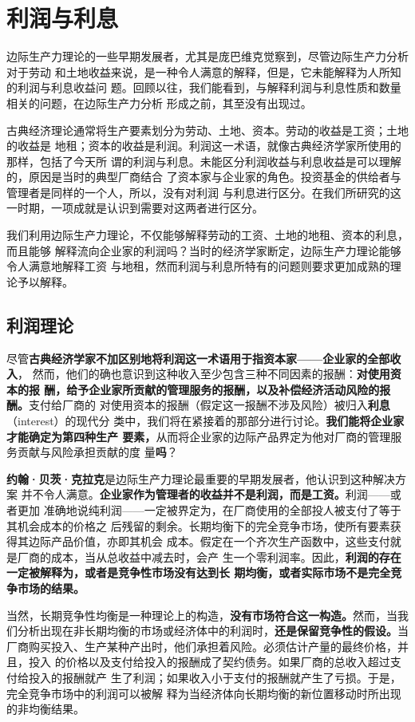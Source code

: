 \section{利润与利息}

边际生产力理论的一些早期发展者，尤其是庞巴维克觉察到，尽管边际生产力分析对于劳动
和土地收益来说，是一种令人满意的解释，但是，它未能解释为人所知的利润与利息收益问
题。回顾以往，我们能看到，与解释利润与利息性质和数量相关的问题，在边际生产力分析
形成之前，其至没有出现过。

古典经济理论通常将生产要素划分为劳动、土地、资本。劳动的收益是工资；土地的收益是
地租；资本的收益是利润。利润这一术语，就像古典经济学家所使用的那样，包括了今天所
谓的利润与利息。未能区分利润收益与利息收益是可以理解的，原因是当时的典型厂商结合
了资本家与企业家的角色。投资基金的供给者与管理者是同样的一个人，所以，没有对利润
与利息进行区分。在我们所研究的这一时期，一项成就是认识到需要对这两者进行区分。

我们利用边际生产力理论，不仅能够解释劳动的工资、土地的地租、资本的利息，而且能够
解释流向企业家的利润吗？当时的经济学家断定，边际生产力理论能够令人满意地解释工资
与地租，然而利润与利息所特有的问题则要求更加成熟的理论予以解释。

\subsection{利润理论}

尽管\textbf{古典经济学家不加区别地将利润这一术语用于指资本家——企业家的全部收入}，
然而，他们的确也意识到这种收入至少包含三种不同因素的报酬：\textbf{对使用资本的报
  酬，给予企业家所贡献的管理服务的报酬，以及补偿经济活动风险的报酬。}支付给厂商的
对使用资本的报酬（假定这一报酬不涉及风险）被归入\textbf{利息}（interest）的现代分
类中，我们将在紧接着的那部分进行讨论。\textbf{我们能将企业家才能确定为第四种生产
  要素，}从而将企业家的边际产品界定为他对厂商的管理服务贡献与风险承担贡献的度
量\textbf{吗}？

\textbf{约翰·贝茨·克拉克}是边际生产力理论最重要的早期发展者，他认识到这种解决方案
并不令人满意。\textbf{企业家作为管理者的收益并不是利润，而是工资。}利润——或者更加
准确地说纯利润——一定被界定为，在厂商使用的全部投人被支付了等于其机会成本的价格之
后残留的剩余。长期均衡下的完全竞争市场，使所有要素获得其边际产品价值，亦即其机会
成本。假定在一个齐次生产函数中，这些支付就是厂商的成本，当从总收益中减去时，会产
生一个零利润率。因此，\textbf{利润的存在一定被解释为，或者是竞争性市场没有达到长
  期均衡，或者实际市场不是完全竞争市场的结果。}

当然，长期竞争性均衡是一种理论上的构造，\textbf{没有市场符合这一构造。}然而，当我
们分析出现在非长期均衡的市场或经济体中的利润时，\textbf{还是保留竞争性的假设。}当
厂商购买投入、生产某种产出时，他们承担着风险。必须估计产量的最终价格，并且，投入
的价格以及支付给投入的报酬成了契约债务。如果厂商的总收入超过支付给投入的报酬就产
生了利润；如果收入小于支付的报酬就产生了亏损。于是，完全竞争市场中的利润可以被解
释为当经济体向长期均衡的新位置移动时所出现的非均衡结果。

